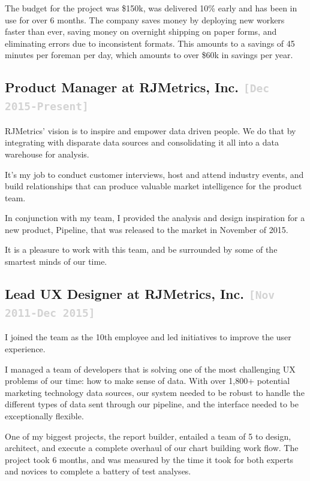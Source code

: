 \documentclass{tufte-handout}
\newcommand{\shstandout}[1]{\textbf{\textcolor{BurntOrange}{#1}}}
\newcommand{\shyears}[1]{\small{\texttt{\textcolor{LightGray}{#1}}}}
\begin{document}
The budget for the project was \$150k, was delivered 10\% early and has been in use for over 6 months. The company saves money by deploying new workers faster than ever, saving money on overnight shipping on paper forms, and eliminating errors due to inconsistent formats. This amounts to a savings of 45 minutes per foreman per day, which amounts to over \$60k in savings per year.




\subsection{\textbf{Product Manager} at \shstandout{RJMetrics, Inc.} \shyears{[Dec 2015-Present]}}

RJMetrics' vision is to inspire and empower data driven people. We do that by integrating with disparate data sources and consolidating it all into a data warehouse for analysis.

It's my job to conduct customer interviews, host and attend industry events, and build relationships that can produce valuable market intelligence for the product team.

In conjunction with my team, I provided the analysis and design inspiration for a new product, Pipeline, that was released to the market in November of 2015.

It is a pleasure to work with this team, and be surrounded by some of the smartest minds of our time.

\subsection{\textbf{Lead UX Designer} at \shstandout{RJMetrics, Inc.} \shyears{[Nov 2011-Dec 2015]}}

I joined the team as the 10th employee and led initiatives to improve the user experience.

I managed a team of developers that is solving one of the most challenging UX problems of our time: how to make sense of data. With over 1,800+ potential marketing technology data sources, our system needed to be robust to handle the different types of data sent through our pipeline, and the interface needed to be exceptionally flexible.

One of my biggest projects, the report builder, entailed a team of 5 to design, architect, and execute a complete overhaul of our chart building work flow. The project took 6 months, and was measured by the time it took for both experts and novices to complete a battery of test analyses.
\end{document}
